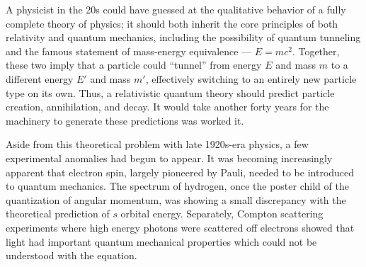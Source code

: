 A physicist in the 20s could have guessed at the qualitative behavior of a fully complete theory of physics; it should both inherit the core principles of both relativity and quantum mechanics, including the possibility of quantum tunneling and the famous statement of mass-energy equivalence --- $E=mc^2$. Together, these two imply that a particle could ``tunnel'' from energy $E$ and mass $m$ to a different energy $E'$ and mass $m'$, effectively switching to an entirely new particle type on its own. Thus, a relativistic quantum theory should predict particle creation, annihilation, and decay. It would take another forty years for the machinery to generate these predictions was worked it.

Aside from this theoretical problem with late 1920s-era physics, a few experimental anomalies had begun to appear. It was becoming increasingly apparent that electron spin, largely pioneered by Pauli, needed to be introduced to quantum mechanics. The spectrum of hydrogen, once the poster child of the quantization of angular momentum, was showing a small discrepancy with the theoretical prediction of $s$ orbital energy. Separately, Compton scattering experiments where high energy photons were scattered off electrons showed that light had important quantum mechanical properties which could not be understood with the \Schrodinger equation.

